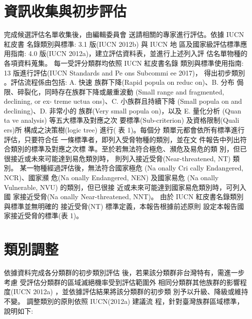 \section{資訊收集與初步評估}
\begin{multicols}{2}
完成候選評估名單收集後，由編輯委員會
送請相關的專家進行評估。依據 IUCN 紅皮書 名錄類別與標準: 3.1 版(IUCN 2012b) 與 IUCN 地 區及國家級評估標準應用指南: 4.0 版(IUCN 2012a)，建立評估資料表，並進行上述列入評 估名單物種的各項資料蒐集。
每一受評分類群均依照 IUCN 紅皮書名錄 類別與標準使用指南: 13 版進行評估(IUCN Standards and Pe  ons Subcommi ee 2017)， 得出初步類別 。評估流程係由包括: A. 快速 族群下降(Rapid popula on reduc on)、B. 分布
侷限、碎裂化，同時存在族群下降或嚴重波動
(Small range and fragmented, declining, or ex- treme  uctua ons)、C. 小族群且持續下降 (Small popula on and declining)、D. 非常小的 族群(Very small popula on)，以及 E. 量化分析 (Quan ta ve analysis) 等五大標準及對應之次 要標準(Sub-criterion) 及資格限制(Quali ers)所 構成之決策樹(logic tree) 進行( 表 1)。每個分 類單元都會依所有標準進行評估，只要符合任 一條標準者，即列入受脅物種的類別，並在文 件報告中列出符合類別的標準及對應之次標 準。至於若無法符合極危、瀕危及易危的類 別，但已很接近或未來可能達到易危類別時， 則列入接近受脅(Near-threatened, NT) 類別。 某一物種經過評估後，無法符合國家極危 (Na onally Cri cally Endangered, NCR)、國家瀕 危(Na onally Endangered, NEN) 及國家易危 (Na onally Vulnerable, NVU) 的類別，但已很接 近或未來可能達到國家易危類別時，可列入國 家接近受脅(Na onally Near-threatened, NNT)。 由於 IUCN 紅皮書名錄類別與標準並無明確的 接近受脅(NT) 標準定義，本報告根據前述原則 設定本報告國家接近受脅的標準(表 1)。
\end{multicols}



\section{類別調整}
\begin{multicols}{2}
依據資料完成各分類群的初步類別評估 後，若果該分類群非台灣特有，需進一步考慮 受評估分類群的區域滅絕機率受到評估範圍外 相同分類群其他族群的影響程度(IUCN
2012a) ，並依據評估結果將該分類群的初步類 別予以升級、降級或維持不變。
調整類別的原則依照 IUCN(2012a) 建議流 程，針對臺灣族群區域標準，說明如下:


\end{multicols}

